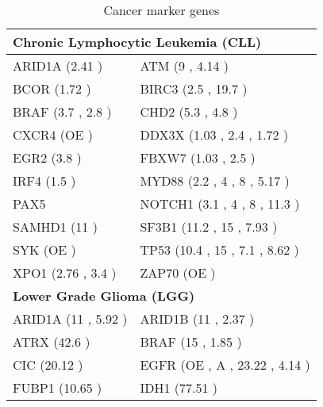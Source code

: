 \documentclass[a4paper,12pt]{article}
\begin{document}
\begin{table}[!htb]
\centering
\small
\caption{Cancer marker genes}
\label{table:spcancermarkers}
\begin{tabular}{ll}
\toprule
\multicolumn{2}{l}{{\bf Chronic Lymphocytic Leukemia (CLL)}}\\ \hline
ARID1A (2.41  \cite{Puente2015, Rubio-Perez2015}) & ATM (9  \cite{Wang2011}, 4.14  \cite{Rubio-Perez2015, Guarini2012}) \\ BCOR (1.72  \cite{Landau2013}) & BIRC3 (2.5  \cite{Baliakas2015}, 19.7 \cite{Alhourani2016}) \\
BRAF (3.7  \cite{Landau2015}, 2.8  \cite{Puente2015, Jebaraj2013}) & CHD2 (5.3  \cite{Rodriguez2015}, 4.8  \cite{Quesada2011, Landau2015}) \\ CXCR4 (OE \cite{Ghobrial2004, Mohle1999, Barretina2003, Crowther-Swanepoel2009}) & DDX3X (1.03  \cite{Rubio-Perez2015}, 2.4  \cite{Wang2011}, 1.72 \cite{Ojha2015}) \\
EGR2 (3.8  \cite{Young2017, Landau2015}) & FBXW7 (1.03 \cite{Rubio-Perez2015}, 2.5  \cite{Wang2011, Jeromin2014}) \\ IRF4 (1.5  \cite{Puente2015, Havelange2011}) & MYD88 (2.2  \cite{Baliakas2015}, 4  \cite{Martinez-Trillos2016}, 8  \cite{Wang2011}, 5.17  \cite{Rubio-Perez2015, Jeromin2014}) \\
PAX5 \cite{Puente2015} & NOTCH1 (3.1  \cite{Rubio-Perez2015}, 4  \cite{Wang2011}, 8  \cite{Baliakas2015}, 11.3 \cite{Rossi2012, Young2017, Jeromin2014}) \\ SAMHD1 (11  \cite{Clifford2014, Rossi2014}) & SF3B1 (11.2  \cite{Baliakas2015}, 15  \cite{Wang2011}, 7.93  \cite{Rubio-Perez2015, Wang2011, Jeromin2014}) \\
SYK (OE \cite{Buchner2009, Baudot2009, Hoellenriegel2012}) & TP53 (10.4  \cite{Baliakas2015}, 15  \cite{Wang2011}, 7.1  \cite{Jeromin2014}, 8.62  \cite{Rubio-Perez2015}) \\ XPO1 (2.76 \cite{Rubio-Perez2015}, 3.4  \cite{Jeromin2014}) & ZAP70 (OE \cite{Wiestner2003, Chen2002}) \\
\hline
\multicolumn{2}{l}{{\bf Lower Grade Glioma (LGG)}}\\ \hline
ARID1A (11  \cite{Sausen2013}, 5.92  \cite{Rubio-Perez2015}) & ARID1B (11  \cite{Sausen2013}, 2.37  \cite{Rubio-Perez2015}) \\ ATRX (42.6  \cite{Wiestler2013, Jiao2012}) & BRAF (15  \cite{Dahiya2014} , 1.85  \cite{McLendonR2008, Knobbe2004}) \\
CIC (20.12  \cite{Jiao2012}) & EGFR (OE \cite{Toth2009}, A \cite{Mukasa2010}, 23.22 \cite{McLendonR2008}, 4.14  \cite{Rubio-Perez2015}) \\ FUBP1 (10.65  \cite{Baumgarten2014}) & IDH1 (77.51  \cite{Parsons2008, Cohen2013}) \\

\end{tabular}
\end{table}
\end{document}
